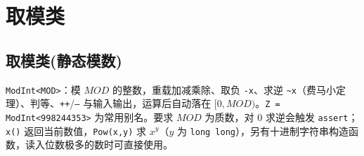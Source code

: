 \section{取模类}

\subsection{取模类(静态模数)}

\verb|ModInt<MOD>|：模 $MOD$ 的整数，重载加减乘除、取负 \verb|-x|、求逆 \verb|~x|（费马小定理）、判等、\texttt{++}/\texttt{--} 与输入输出，运算后自动落在 $[0,MOD)$。\verb|Z = ModInt<998244353>| 为常用别名。要求 $MOD$ 为质数，对 $0$ 求逆会触发 \texttt{assert}；\verb|x()| 返回当前数值，\verb|Pow(x,y)| 求 $x^y$（$y$ 为 \texttt{long long}），另有十进制字符串构造函数，读入位数极多的数时可直接使用。

